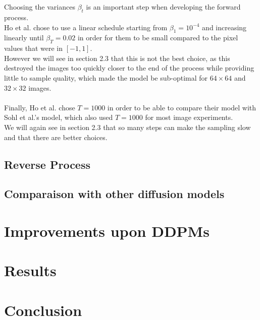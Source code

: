 \documentclass{article}
\begin{document}
\\\\
Choosing the variances $\beta_t$ is an important step when developing the forward process. \\
Ho et al. \cite{ho2020denoising} chose to use a linear schedule starting from $\beta_1 = 10^{-4}$ and increasing linearly until $\beta_T = 0.02$ in order for them to be small compared to the pixel values that were in $[-1, 1]$. \cite{ho2020denoising} \\
However we will see in section 2.3 that this is not the best choice, as this destroyed the images too quickly closer to the end of the process while providing little to sample quality, which made the model be sub-optimal for $64 \times 64$ and $32 \times 32$ images. \cite{nichol2021improved}
\\\\
Finally, Ho et al. \cite{ho2020denoising} chose $T = 1000$ in order to be able to compare their model with Sohl et al.'s \cite{sohldickstein2015deep} model, which also used $T = 1000$ for most image experiments. \\
We will again see in section 2.3 that so many steps can make the sampling slow and that there are better choices. \cite{nichol2021improved}
\subsection{Reverse Process}

\subsection{Comparaison with other diffusion models}

\newpage
\section{Improvements upon DDPMs}

\newpage
\section{Results}

\newpage
\section{Conclusion}


\newpage
\printbibliography
\end{document}
